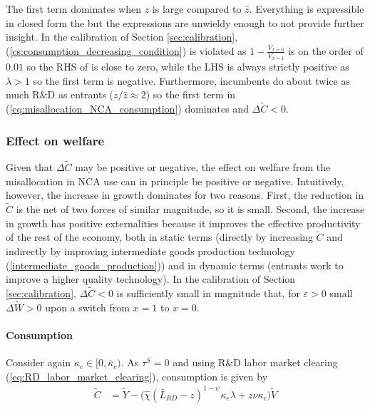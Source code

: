 The first term dominates when $z$ is large compared to $\hat{z}$. Everything is expressible in closed form the but the expressions are unwieldy enough to not provide further insight. In the calibration of Section \ref{sec:calibration}, (\ref{cs:consumption_decreasing_condition}) is violated as $1 - \frac{V_{x = 0}}{V_{x = 1}}$ is on the order of $0.01$ so the RHS of is close to zero, while the LHS is always strictly positive as $\lambda > 1$ so the first term is negative. Furthermore, incumbents do about twice as much R\&D as entrants ($z / \hat{z} \approx 2 $) so the first term in (\ref{eq:misallocation_NCA_consumption}) dominates and $\Delta \tilde{C} < 0$.

\subsubsection{Effect on welfare}

Given that $\Delta \tilde{C}$ may be positive or negative, the effect on welfare from the misallocation in NCA use can in principle be positive or negative. Intuitively, however, the increase in growth dominates for two reasons. First, the reduction in $\tilde{C}$ is the net of two forces of similar magnitude, so it is small. Second, the increase in growth has positive externalities because it improves the effective productivity of the rest of the economy, both in static terms (directly by increasing $\tilde{C}$ and indirectly by improving intermediate goods production technology (\ref{intermediate_goods_production})) and in dynamic terms (entrants work to improve a higher quality technology). In the calibration of Section \ref{sec:calibration}, $\Delta \tilde{C} < 0$ is sufficiently small in magnitude that, for $\varepsilon > 0$ small $\Delta \tilde{W} > 0$ upon a switch from $x = 1$ to $x = 0$. 





\paragraph{Consumption}\label{cs:consumption1}

Consider again $\kappa_c \in [0, \bar{\kappa}_c)$. As $\tau^S = 0$ and using R\&D labor market clearing (\ref{eq:RD_labor_market_clearing}), consumption is given by 
\begin{align}
\tilde{C} &= \tilde{Y} - \Big( \hat{\chi} (\bar{L}_{RD} - z)^{1-\psi} \kappa_e \lambda + z \nu \kappa_c \Big) \tilde{V} \label{cs:consumption_eq}
\end{align}

